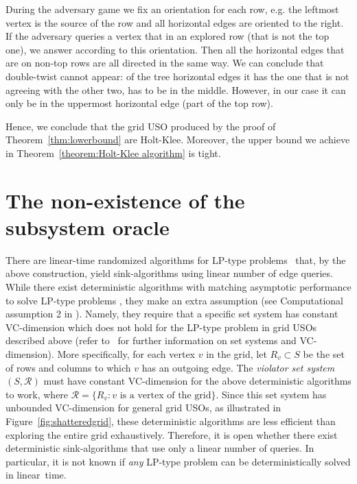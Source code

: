 \documentclass[runningheads,a4paper]{llncs}
\begin{document}
During the adversary game we fix an orientation for each row, e.g. the leftmost vertex is the source of the row and all horizontal edges are oriented 
to the right. If the adversary queries a vertex that in an explored row (that is not the top one), we answer according to this orientation.
Then all the horizontal edges that are on non-top rows are all directed in the same way. We can conclude that double-twist cannot appear:
of the tree horizontal edges it has the one that is not agreeing with the other two, has to be in the middle. However, in our case it can only 
be in the uppermost horizontal edge (part of the top row). 

Hence, we conclude that the grid USO produced by the proof of Theorem~\ref{thm:lowerbound} are Holt-Klee. Moreover, the 
upper bound we achieve in Theorem~\ref{theorem:Holt-Klee algorithm} is tight.



\section{The non-existence of the subsystem oracle} \label{app:nosubsystem}
There are linear-time randomized algorithms for LP-type problems~\cite{MatousekSW96} that, by the above construction, yield sink-algorithms using linear number of edge queries. 
While there exist deterministic algorithms with matching asymptotic performance to solve LP-type problems \cite{chan16,ChazelleM96}, they make an extra assumption  
(see Computational assumption 2 in \cite{ChazelleM96}). 
Namely, they require that a specific set system has constant VC-dimension which does not hold for the LP-type problem in grid USOs described above (refer to~\cite{matouvsek2002lectures} for further information on set systems and VC-dimension). More specifically, for each vertex $v$ in the grid, let $R_v\subset S$ be the set of rows and columns to which $v$ has an outgoing edge. 
The \emph{violator set system} $(S, \mathcal R)$ must have constant VC-dimension for the above deterministic algorithms to work, where $\mathcal R = \{R_v : v\text{ is a vertex of the grid}\}$. 
Since this set system has unbounded VC-dimension for general grid USOs, as illustrated in Figure~\ref{fig:shatteredgrid}, these deterministic algorithms are less efficient than exploring the entire grid exhaustively. 
Therefore, it is open whether there exist deterministic sink-algorithms that use only a linear number of queries. 
In particular, it is not known if \emph{any} LP-type problem can be deterministically solved in linear~time. 
\end{document}
